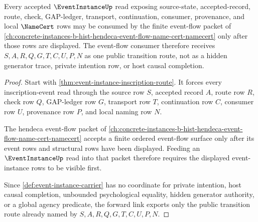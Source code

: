 \begin{theorem}
\label{thm:event-instance-event-flow-forward-link}
Every accepted $\EventInstanceUp$ read exposing source-state, accepted-record, route, check, GAP-ledger, transport, continuation, consumer, provenance, and local $\NameCert$ rows may be consumed by the finite event-flow packet of \autoref{ch:concrete-instances-b-hist-hendeca-event-flow-name-cert-namecert} only after those rows are displayed. The event-flow consumer therefore receives $S,A,R,Q,G,T,C,U,P,N$ as one public transition route, not as a hidden generator trace, private intention row, or host causal completion.
\end{theorem}
\begin{proof}
Start with \autoref{thm:event-instance-inscription-route}. It forces every inscription-event read through the source row $S$, accepted record $A$, route row $R$, check row $Q$, GAP-ledger row $G$, transport row $T$, continuation row $C$, consumer row $U$, provenance row $P$, and local naming row $N$.

The hendeca event-flow packet of \autoref{ch:concrete-instances-b-hist-hendeca-event-flow-name-cert-namecert} accepts a finite ordered event-flow surface only after its event rows and structural rows have been displayed. Feeding an $\EventInstanceUp$ read into that packet therefore requires the displayed event-instance rows to be visible first.

Since \autoref{def:event-instance-carrier} has no coordinate for private intention, host causal completion, unbounded psychological equality, hidden generator authority, or a global agency predicate, the forward link exports only the public transition route already named by $S,A,R,Q,G,T,C,U,P,N$.
\end{proof}



